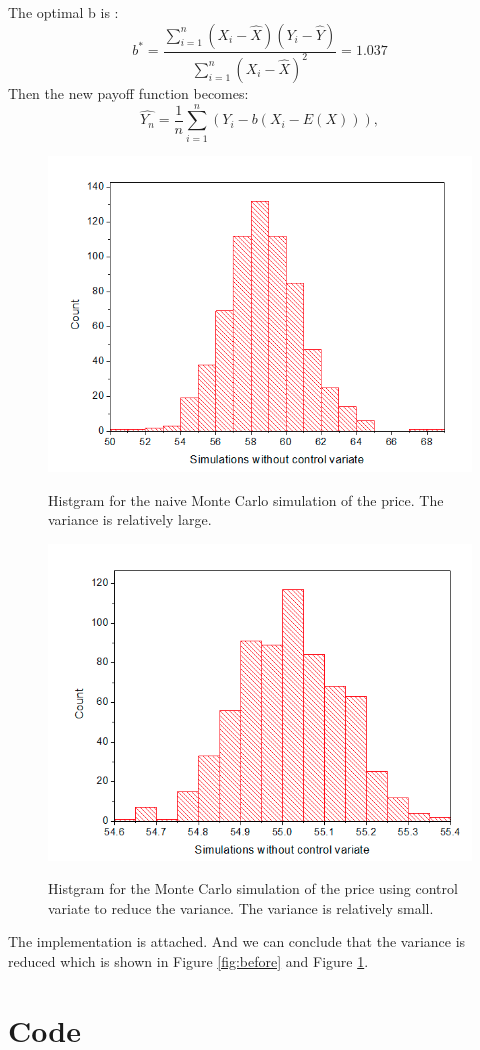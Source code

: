 \documentclass{report}
\begin{document}
The optimal b is : 
$$b^*=\frac{\sum_{i=1}^{n}(X_i-\hat{X}) (Y_i-\hat{Y}) }{\sum_{i=1}^{n}(X_i-\hat{X})^2} = 1.037 $$
Then the new payoff function becomes: 
$$\hat{Y_n}=\frac{1}{n}\sum_{i=1}^{n}(Y_i-b(X_i-E(X))), $$

\begin{figure} \centering
\includegraphics[width=\textwidth]{before}\label{fig:before}
\caption{Histgram for the naive Monte Carlo simulation of the price. The variance is relatively large.}  
\includegraphics[width=\textwidth]{after}\label{fig:after}
\caption{Histgram for the Monte Carlo simulation of the price using control variate to reduce the variance. The variance is relatively small.}  
\end{figure}
The implementation is attached. And we can conclude that the variance is reduced which is shown in Figure \ref{fig:before} and Figure \ref{fig:after}. 
\newpage
\section{Code} 
\verbtime
\end{document}

